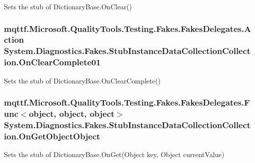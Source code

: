Sets the stub of Dictionary\-Base.\-On\-Clear()

\hypertarget{class_system_1_1_diagnostics_1_1_fakes_1_1_stub_instance_data_collection_collection_a78b12f1f5870037d6cbba8652f91574b}{
\subsubsection[{On\-Clear\-Complete01}]{\setlength{\rightskip}{0pt plus 5cm}mqttf.\-Microsoft.\-Quality\-Tools.\-Testing.\-Fakes.\-Fakes\-Delegates.\-Action System.\-Diagnostics.\-Fakes.\-Stub\-Instance\-Data\-Collection\-Collection.\-On\-Clear\-Complete01}}\label{class_system_1_1_diagnostics_1_1_fakes_1_1_stub_instance_data_collection_collection_a78b12f1f5870037d6cbba8652f91574b}


Sets the stub of Dictionary\-Base.\-On\-Clear\-Complete()

\hypertarget{class_system_1_1_diagnostics_1_1_fakes_1_1_stub_instance_data_collection_collection_a8bf8721af125f059dc1eaf8d669ab1a5}{
\subsubsection[{On\-Get\-Object\-Object}]{\setlength{\rightskip}{0pt plus 5cm}mqttf.\-Microsoft.\-Quality\-Tools.\-Testing.\-Fakes.\-Fakes\-Delegates.\-Func$<$object, object, object$>$ System.\-Diagnostics.\-Fakes.\-Stub\-Instance\-Data\-Collection\-Collection.\-On\-Get\-Object\-Object}}\label{class_system_1_1_diagnostics_1_1_fakes_1_1_stub_instance_data_collection_collection_a8bf8721af125f059dc1eaf8d669ab1a5}


Sets the stub of Dictionary\-Base.\-On\-Get(\-Object key, Object current\-Value)

